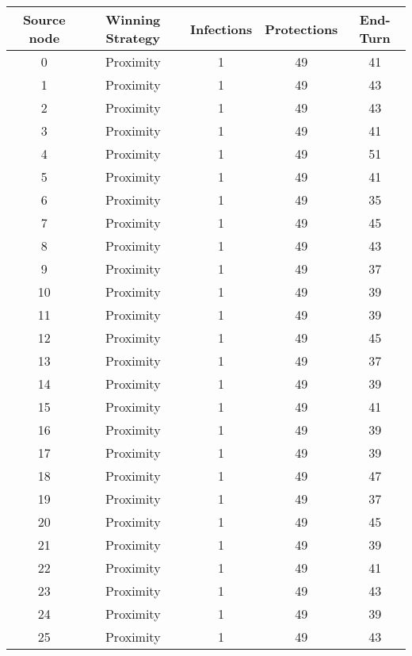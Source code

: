 \documentclass[results.tex]{subfiles}
\begin{document}
\begin{center}
  \begin{tabular}{| c || c | c | c | c |}
    \hline
    {\bfseries Source node} & {\bfseries Winning Strategy} & {\bfseries Infections} & {\bfseries Protections} & {\bfseries End-Turn} \\  %
    \hline\hline
    0 & Proximity & 1 & 49 & 41 \\ 
    \hline
    1 & Proximity & 1 & 49 & 43 \\ 
    \hline
    2 & Proximity & 1 & 49 & 43 \\ 
    \hline
    3 & Proximity & 1 & 49 & 41 \\ 
    \hline
    4 & Proximity & 1 & 49 & 51 \\ 
    \hline
    5 & Proximity & 1 & 49 & 41 \\ 
    \hline
    6 & Proximity & 1 & 49 & 35 \\ 
    \hline
    7 & Proximity & 1 & 49 & 45 \\ 
    \hline
    8 & Proximity & 1 & 49 & 43 \\ 
    \hline
    9 & Proximity & 1 & 49 & 37 \\ 
    \hline
    10 & Proximity & 1 & 49 & 39 \\ 
    \hline
    11 & Proximity & 1 & 49 & 39 \\ 
    \hline
    12 & Proximity & 1 & 49 & 45 \\ 
    \hline
    13 & Proximity & 1 & 49 & 37 \\ 
    \hline
    14 & Proximity & 1 & 49 & 39 \\ 
    \hline
    15 & Proximity & 1 & 49 & 41 \\ 
    \hline
    16 & Proximity & 1 & 49 & 39 \\ 
    \hline
    17 & Proximity & 1 & 49 & 39 \\ 
    \hline
    18 & Proximity & 1 & 49 & 47 \\ 
    \hline
    19 & Proximity & 1 & 49 & 37 \\ 
    \hline
    20 & Proximity & 1 & 49 & 45 \\ 
    \hline
    21 & Proximity & 1 & 49 & 39 \\ 
    \hline
    22 & Proximity & 1 & 49 & 41 \\ 
    \hline
    23 & Proximity & 1 & 49 & 43 \\ 
    \hline
    24 & Proximity & 1 & 49 & 39 \\ 
    \hline
    25 & Proximity & 1 & 49 & 43 \\ 

\end{tabular}
\end{center}
\end{document}
